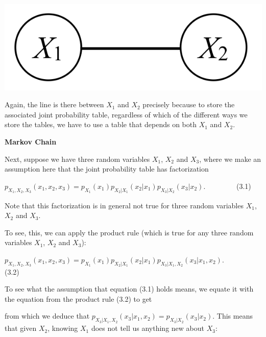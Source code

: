 \documentclass[6008notes.tex]{subfiles}
\begin{document}
{\centering\includegraphics[scale=0.4]{images_sec-graphical-models-2-rv-possibly-dependent} \par}

Again, the line is there between $X_1$ and $X_2$ precisely because to store the associated joint probability table, regardless of which of the different ways we store the tables, we have to use a table that depends on both $X_1$ and $X_2$.

\textbf{Markov Chain}

Next, suppose we have three random variables $X_1$, $X_2$ and $X_3$, where we make an assumption here that the joint probability table has factorization

{\centering$p_{X_1,X_2,X_3}(x_1,x_2,x_3) = p_{X_1}(x_1) p_{X_2|X_1}(x_2|x_1) p_{X_3|X_2}(x_3|x_2). \qquad \qquad$ (3.1) \par}

Note that this factorization is in general not true for three random variables $X_1$, $X_2$ and $X_3$.

To see, this, we can apply the product rule (which is true for any three random variables $X_1$, $X_2$ and $X_3$):

{\centering$p_{X_1,X_2,X_3}(x_1,x_2,x_3) = p_{X_1}(x_1) p_{X_2|X_1}(x_2|x_1) p_{X_3|X_1, X_2}(x_3|x_1, x_2). \qquad \qquad$ (3.2) \par}

To see what the assumption that equation (3.1) holds means, we equate it with the equation from the product rule (3.2) to get

{ \par}
				
from which we deduce that $p_{X_3|X_1,X_2}(x_3|x_1,x_2)=p_{X_3|X_2}(x_3|x_2)$. This means that given $X_2$, knowing $X_1$ does not tell us anything new about $X_3$:
\end{document}

